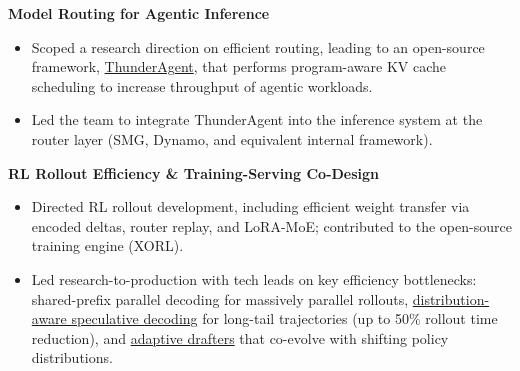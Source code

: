 \documentclass[11pt,letterpaper]{article}
\begin{document}
\vspace{6pt}
\noindent\textbf{Model Routing for Agentic Inference}
\begin{itemize}
\item
Scoped a research direction on efficient routing, leading to an open-source framework, \href{https://arxiv.org/abs/2602.13692}{ThunderAgent}, that performs program-aware KV cache scheduling to increase throughput of agentic workloads.
\item
Led the team to integrate ThunderAgent into the inference system at the router layer (SMG, Dynamo, and equivalent internal framework).
\end{itemize}





\vspace{6pt}
\noindent\textbf{RL Rollout Efficiency \& Training-Serving Co-Design}
\begin{itemize}
\item
Directed RL rollout development, including efficient weight transfer via encoded deltas, router replay, and LoRA-MoE; contributed to the open-source training engine (XORL).
\item
Led research-to-production with tech leads on key efficiency bottlenecks: shared-prefix parallel decoding for massively parallel rollouts, \href{https://arxiv.org/abs/2511.13841}{distribution-aware speculative decoding} for long-tail trajectories (up to 50\% rollout time reduction), and \href{https://arxiv.org/abs/2602.06932}{adaptive drafters} that co-evolve with shifting policy distributions.
\end{itemize}
\end{document}
